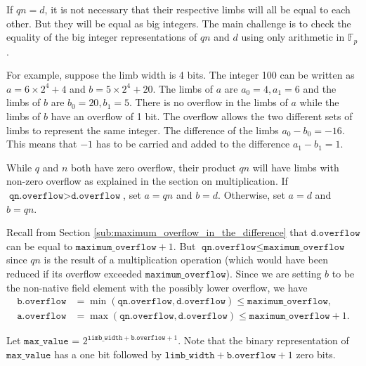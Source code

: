 \documentclass[a4paper, 12pt]{article}
\begin{document}
If $qn = d$, it is not necessary that their respective limbs will all be equal to each other. But they will be equal as big integers. 
 The main challenge is to check the equality of the big integer representations of $qn$ and $d$ using only arithmetic in $\mathbb{F}_p$.

For example, suppose the limb width is 4 bits. The integer 100 can be written as $a = 6 \times 2^4 + 4$ and $b = 5 \times 2^4  +20$. The limbs of $a$ are $a_0=4, a_1=6$ and the limbs of $b$ are $b_0 = 20, b_1 =5$. There is no overflow in the limbs of $a$ while the limbs of $b$ have an overflow of 1 bit. The overflow allows the two different sets of limbs to represent the same integer. The difference of the limbs $a_0 - b_0 = -16$. This means that $-1$ has to be carried and added to the difference $a_1 - b_1 = 1$.


While $q$ and $n$ both have zero overflow, their product $qn$ will have limbs with non-zero overflow as explained in the section on multiplication. If $\texttt{qn.overflow} > \texttt{d.overflow}$, set $a = qn$ and $b = d$. Otherwise, set $a = d$ and $b = qn$.

Recall from Section \ref{sub:maximum_overflow_in_the_difference} that $\texttt{d.overflow}$ can be equal to $\texttt{maximum\_overflow} + 1$. But $\texttt{qn.overflow} \le \texttt{maximum\_overflow}$ since $qn$ is the result of a multiplication operation (which would have been reduced if its overflow exceeded $\texttt{maximum\_overflow}$). Since we are setting $b$ to be the non-native field element with the possibly lower overflow, we have
\begin{align*}
  \texttt{b.overflow} & = \min(\texttt{qn.overflow}, \texttt{d.overflow}) \le \texttt{maximum\_overflow}, \\
\texttt{a.overflow} & = \max(\texttt{qn.overflow}, \texttt{d.overflow}) \le \texttt{maximum\_overflow} + 1.
\end{align*}

Let $\texttt{max\_value}$ = $2^{\texttt{limb\_width}+\texttt{b.overflow}+1}$. Note that the binary representation of $\texttt{max\_value}$ has a one bit followed by $\texttt{limb\_width} + \texttt{b.overflow}+1$ zero bits. 
\end{document}
